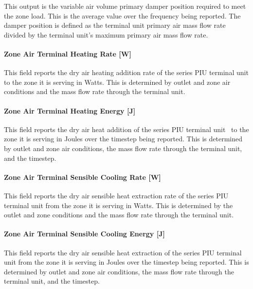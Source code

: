 This output is the variable air volume primary damper position required to meet the zone load. This is the average value over the frequency being reported. The damper position is defined as the terminal unit primary air mass flow rate divided by the terminal unit's maximum primary air mass flow rate.

\paragraph{Zone Air Terminal Heating Rate {[}W{]}}\label{zone-air-terminal-heating-rate-w}

This field reports the dry air heating addition rate of the series PIU terminal unit to the zone it is serving in Watts. This is determined by outlet and zone air conditions and the mass flow rate through the terminal unit.

\paragraph{Zone Air Terminal Heating Energy {[}J{]}}\label{zone-air-terminal-heating-energy-j}

This field reports the dry air heat addition of the series PIU terminal unit~ to the zone it is serving in Joules over the timestep being reported. This is determined by outlet and zone air conditions, the mass flow rate through the terminal unit, and the timestep.

\paragraph{Zone Air Terminal Sensible Cooling Rate {[}W{]}}\label{zone-air-terminal-sensible-cooling-rate-w-1}

This field reports the dry air sensible heat extraction rate of the series PIU terminal unit from the zone it is serving in Watts. This is determined by the outlet and zone conditions and the mass flow rate through the terminal unit.

\paragraph{Zone Air Terminal Sensible Cooling Energy {[}J{]}}\label{zone-air-terminal-sensible-cooling-energy-j-1}

This field reports the dry air sensible heat extraction of the series PIU terminal unit from the zone it is serving in Joules over the timestep being reported. This is determined by outlet and zone air conditions, the mass flow rate through the terminal unit, and the timestep.

